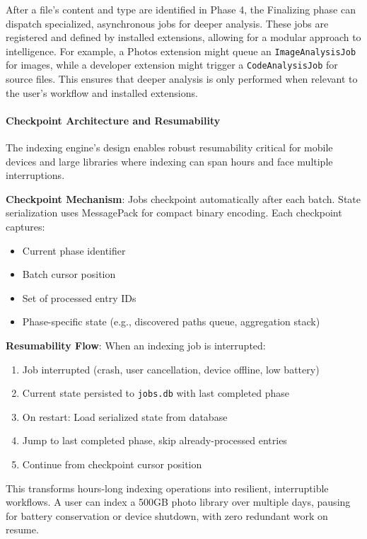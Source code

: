 \documentclass[sigconf]{acmart}
\begin{document}
After a file's content and type are identified in Phase 4, the Finalizing phase can dispatch specialized, asynchronous jobs for deeper analysis. These jobs are registered and defined by installed extensions, allowing for a modular approach to intelligence. For example, a Photos extension might queue an \texttt{ImageAnalysisJob} for images, while a developer extension might trigger a \texttt{CodeAnalysisJob} for source files. This ensures that deeper analysis is only performed when relevant to the user's workflow and installed extensions.

\paragraph{Checkpoint Architecture and Resumability}

The indexing engine's design enables robust resumability critical for mobile devices and large libraries where indexing can span hours and face multiple interruptions.

\textbf{Checkpoint Mechanism}: Jobs checkpoint automatically after each batch. State serialization uses MessagePack for compact binary encoding. Each checkpoint captures:

\begin{itemize}[noitemsep, topsep=0pt]
 \item Current phase identifier
 \item Batch cursor position
 \item Set of processed entry IDs
 \item Phase-specific state (e.g., discovered paths queue, aggregation stack)
\end{itemize}

\textbf{Resumability Flow}: When an indexing job is interrupted:

\begin{enumerate}[noitemsep, topsep=0pt]
 \item Job interrupted (crash, user cancellation, device offline, low battery)
 \item Current state persisted to \texttt{jobs.db} with last completed phase
 \item On restart: Load serialized state from database
 \item Jump to last completed phase, skip already-processed entries
 \item Continue from checkpoint cursor position
\end{enumerate}

This transforms hours-long indexing operations into resilient, interruptible workflows. A user can index a 500GB photo library over multiple days, pausing for battery conservation or device shutdown, with zero redundant work on resume.
\end{document}
